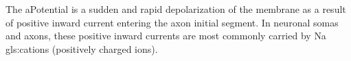\documentclass[../../Orator]{subfiles}
\begin{document}

The \gls{aPotential} is a sudden and rapid depolarization of the membrane as a result of positive inward current entering the axon initial segment. In neuronal somas and axons, these positive inward currents are most commonly carried by \gls{Na} \glspl{gls:cation} (positively charged ions).
\end{document}
